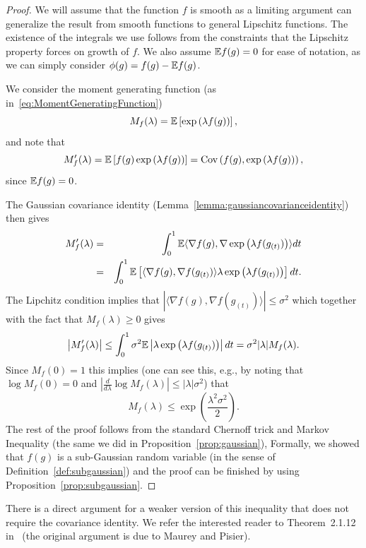 \begin{proof}
We will assume that the function $f$ is smooth as a limiting argument can generalize the result from smooth functions to general Lipschitz functions. The existence of the integrals we use follows from the constraints that the Lipschitz property forces on growth of $f$. We also assume $\mathbb{E} f(g)=0$ for ease of notation, as we can simply consider $\phi(g)=f(g)-\mathbb{E} f(g)$.

We consider the moment generating function (as in~\eqref{eq:MomentGeneratingFunction})
\[
M_f(\lambda) = \mathbb{E}\left[ \exp\left( \lambda f(g) \right)  \right],
\]
and note that
\[
M_f'(\lambda) = \mathbb{E}\left[ f(g)\exp\left( \lambda f(g) \right) \right] = \operatorname{Cov}\left(f(g),\exp\left( \lambda f(g) \right) \right),
\]
since $\mathbb{E} f(g)=0$.

The Gaussian covariance identity (Lemma~\ref{lemma:gaussiancovarianceidentity}) then gives
\begin{eqnarray*}
M_f'(\lambda) &=& \int_{0}^{1}\mathbb{E} \langle \nabla f(g),\nabla \exp\left( \lambda f(g_{(t)}) \right) \rangle dt \\ &=& \int_{0}^{1}\mathbb{E} \left[ \langle \nabla f(g),\nabla f(g_{(t)}) \rangle \lambda   \exp\left( \lambda f(g_{(t)}) \right) \right] dt.
\end{eqnarray*}
The Lipchitz condition implies that $|\langle \nabla f(g),\nabla f(g_{(t)}) \rangle|\leq \sigma^2$ which together with the fact that $M_f(\lambda)\geq 0$ gives
\[
\left|M_f'(\lambda)\right| \leq \int_{0}^{1}\sigma^2\mathbb{E} \left| \lambda   \exp\left( \lambda f(g_{(t)}) \right) \right|  dt = \sigma^2|\lambda| M_f(\lambda).
\]
Since $M_f(0)=1$ this implies (one can see this, e.g., by noting that $\log M_f(0)=0$ and $\left|\frac{d}{d\lambda}\log M_f(\lambda) \right| \leq |\lambda| \sigma^2$) that
\[
M_f(\lambda)\leq \exp\left(\frac{\lambda^2 \sigma^2}{2}\right).
\]
The rest of the proof follows from the standard Chernoff trick and Markov Inequality (the same we did in Proposition~\ref{prop:gaussian}), Formally, we showed that $f(g)$ is a sub-Gaussian random variable (in the sense of Definition~\ref{def:subgaussian}) and the proof can be finished by using Proposition~\ref{prop:subgaussian}.

\end{proof}

There is a direct argument for a weaker version of this inequality that does not require the covariance identity. We refer the interested reader to  Theorem~2.1.12 in~\cite{Tao_topicsRMT} (the original argument is due to Maurey and Pisier).



